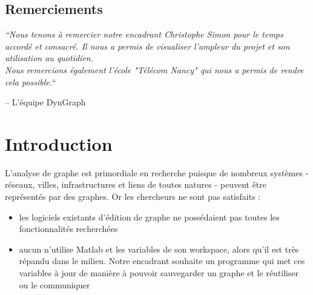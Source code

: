 \documentclass[pidr]{tnreport}
\begin{document}
  
\maketitle
{}


\cleardoublepage

\makesecondtitle

\section*{Remerciements}

{\em
``Nous tenons à remercier notre encadrant Christophe Simon pour le temps accordé et consacré. Il nous a permis de visualiser l'ampleur du projet et son utilisation au quotidien.\\
Nous remercions également l'école "Télécom Nancy" qui nous a permis de rendre cela possible.``
}

\hspace{4cm} -- L'équipe DynGraph


\cleardoublepage

\renewcommand{\baselinestretch}{0.5}\normalsize
\tableofcontents
\renewcommand{\baselinestretch}{1.0}\normalsize
\cleardoublepage

\setcounter{page}{1}

\chapter{Introduction}

L’analyse de graphe est primordiale en recherche puisque de nombreux systèmes - réseaux, villes, infrastructures et liens de toutes natures - peuvent être représentés par des graphes.
Or les chercheurs ne sont pas satisfaits : 

\begin{itemize}
\item les logiciels existants d’édition de graphe ne possédaient pas toutes les fonctionnalités recherchées
\item aucun n’utilise Matlab et les variables de son workspace, alors qu’il est très répandu dans le milieu. Notre encadrant souhaite un programme qui met ces variables à jour  de manière à pouvoir sauvegarder un graphe et le réutiliser ou le communiquer
\end{itemize}
\end{document}
